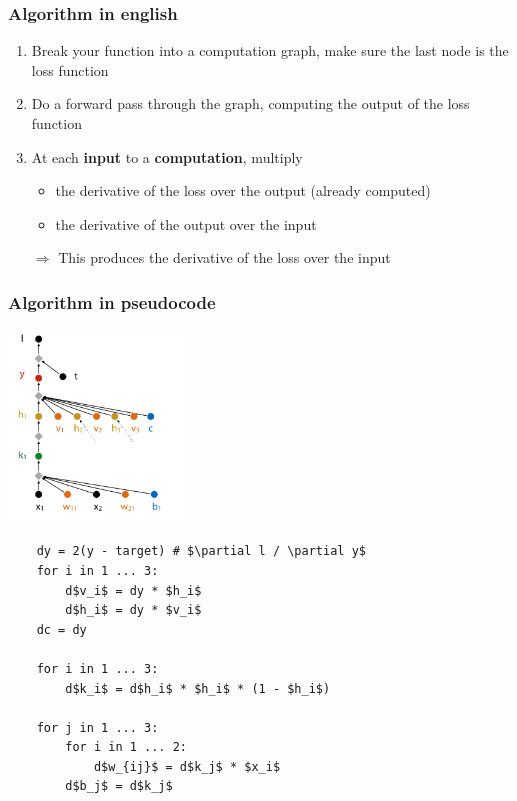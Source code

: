 \documentclass[12pt]{article}
\begin{document}
\subsubsection*{Algorithm in english}
\begin{enumerate}[leftmargin=*, noitemsep]
    \item Break your function into a computation graph, make sure the last node is the loss function
    \item Do a forward pass through the graph, computing the output of the loss function
    \item At each \textbf{input} to a \textbf{computation}, multiply 
    \begin{itemize}[leftmargin=*, noitemsep]
        \item the derivative of the loss over the output (already computed)
        \item the derivative of the output over the input 
    \end{itemize}
    \item[$\Rightarrow$] This produces the derivative of the loss over the input
\end{enumerate}
\subsubsection*{Algorithm in pseudocode}

\begin{multicols}{2}
    \includegraphics[width=0.35\textwidth]{assets/compgraph2.png}
    \columnbreak
    \begin{lstlisting}
    dy = 2(y - target) # $\partial l / \partial y$
    for i in 1 ... 3: 
        d$v_i$ = dy * $h_i$ 
        d$h_i$ = dy * $v_i$ 
    dc = dy

    for i in 1 ... 3: 
        d$k_i$ = d$h_i$ * $h_i$ * (1 - $h_i$)

    for j in 1 ... 3: 
        for i in 1 ... 2: 
            d$w_{ij}$ = d$k_j$ * $x_i$
        d$b_j$ = d$k_j$
    \end{lstlisting}
\end{multicols}
\end{document}
